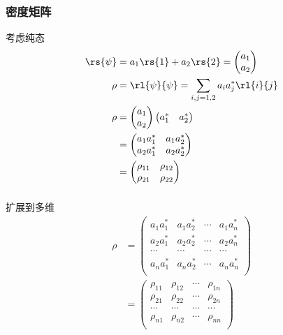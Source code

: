  
\begin{frame}[label=current]
    \frametitle{密度矩阵}
    考虑纯态
    \[ \begin{aligned}
       \rs{\psi} & = a_1\rs{1} + a_2\rs{2} =  \begin{pmatrix}
        a_1  \\
        a_2 
    \end{pmatrix} \\
       \rho & = \rl{\psi}{\psi}  = \sum_{i,j=1,2} a_i a_j ^* \rl{i} {j}\\
       \rho & = \begin{pmatrix}
        a_1  \\
        a_2 
    \end{pmatrix} \begin{pmatrix}
        a^* _1  &  a^* _2
    \end{pmatrix}\\
    &= \begin{pmatrix}
        a_1a_1 ^* & a_1a_2 ^*  \\
        a_2a_1 ^* & a_2a_2 ^*  
    \end{pmatrix} \\ 
    &= \begin{pmatrix}
        \rho_{11} & \rho_{12}  \\
        \rho_{21} & \rho_{22}  
    \end{pmatrix} \\ 
    \end{aligned}\]     
\end{frame}

\begin{frame}[label=current]
  \frametitle{}
扩展到多维
\[ \begin{aligned}
    \rho 
 &= \begin{pmatrix}
     a_1a_1 ^* & a_1a_2 ^* & \cdots &a_1a_n ^*  \\
     a_2a_1 ^* & a_2a_2 ^*  &\cdots & a_2a_n ^* \\
     \cdots &  \cdots &       \cdots & \cdots  \\
     a_na_1 ^* & a_na_2 ^*  &\cdots & a_na_n ^* \\
 \end{pmatrix} \\ 
 &= \begin{pmatrix}
     \rho_{11} & \rho_{12} & \cdots  & \rho_{1n} \\
     \rho_{21} & \rho_{22} & \cdots  & \rho_{2n} \\
     \cdots &  \cdots &       \cdots & \cdots  \\
     \rho_{n1} & \rho_{n2} & \cdots  & \rho_{nn} \\
 \end{pmatrix} \\ 
 \end{aligned}\]  
\end{frame} 

